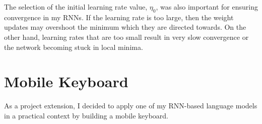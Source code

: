 \documentclass[a4paper, 12pt]{report}
\begin{document}
The selection of the initial learning rate value, $\eta_0$, was also important for ensuring convergence in my RNNs. If the learning rate is too large, then the weight updates may overshoot the minimum which they are directed towards. On the other hand, learning rates that are too small result in very slow convergence or the network becoming stuck in local minima.

\section{Mobile Keyboard} \label{mobile_keyboard}

As a project extension, I decided to apply one of my RNN-based language models in a practical context by building a mobile keyboard. \\
\end{document}
